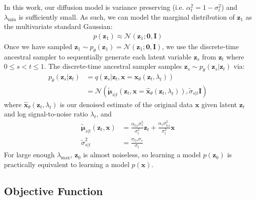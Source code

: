 \documentclass[ oneside,%
                    author={George Herbert},
                    degree={MSci},
                     title={Video Diffusion Models for Climate Simulations},
                  subtitle={}]{dissertation}
\begin{document}
In this work, our diffusion model is variance preserving (i.e. $\alpha_t^2=1-\sigma_t^2$) and $\lambda_{\min}$ is sufficiently small. As such, we can model the marginal distribution of $\mathbf{z}_1$ as the multivariate standard Gaussian:
\begin{align}
      p(\mathbf{z}_1)\approx\mathcal{N}(\mathbf{z}_1;\mathbf{0}, \mathbf{I})
\end{align}
Once we have sampled $\mathbf{z}_1\sim p_\theta(\mathbf{z}_1)=\mathcal{N}(\mathbf{z}_1; \mathbf{0}, \mathbf{I})$, we use the discrete-time ancestral sampler \cite{DDPM_Ho} to sequentially generate each latent variable $\mathbf{z}_s$ from $\mathbf{z}_t$ where $0\le s < t \le 1$. The discrete-time ancestral sampler samples $\mathbf{z}_s\sim p_\theta(\mathbf{z}_s|\mathbf{z}_t)$ via:
\begin{align}
      p_\theta(\mathbf{z}_s|\mathbf{z}_t)&=q(\mathbf{z}_s|\mathbf{z}_t,\mathbf{x}=\hat{\mathbf{x}}_\theta(\mathbf{z}_t,\lambda_t))\\
      &=\mathcal{N}\left(\tilde{\boldsymbol\mu}_{s|t}(\mathbf{z}_t,\mathbf{x}=\hat{\mathbf{x}}_\theta(\mathbf{z}_t,\lambda_t)), \tilde{\sigma}_{s|t}\mathbf{I}\right)
\end{align}
where $\hat{\mathbf{x}}_\theta(\mathbf{z}_t,\lambda_t)$ is our denoised estimate of the original data $\mathbf{x}$ given latent $\mathbf{z}_t$ and log signal-to-noise ratio $\lambda_t$, and
\begin{align}
      \tilde{\boldsymbol\mu}_{s|t}(\mathbf{z}_t,\mathbf{x})&=\frac{\alpha_{t|s}\sigma_s^2}{\sigma_t^2}\mathbf{z}_t+\frac{\alpha_s\sigma_{t|s}^2}{\sigma_t^2}\mathbf{x}\\
      \tilde{\sigma}_{s|t}^2&=\frac{\sigma_{t|s}\sigma_s}{\sigma_t}
\end{align}
For large enough $\lambda_{\max}$, $\mathbf{z}_0$ is almost noiseless, so learning a model $p(\mathbf{z}_0)$ is practically equivalent to learning a model $p(\mathbf{x})$. 

\subsection{Objective Function}
\label{sec:background_diffusion_objective}
\end{document}
